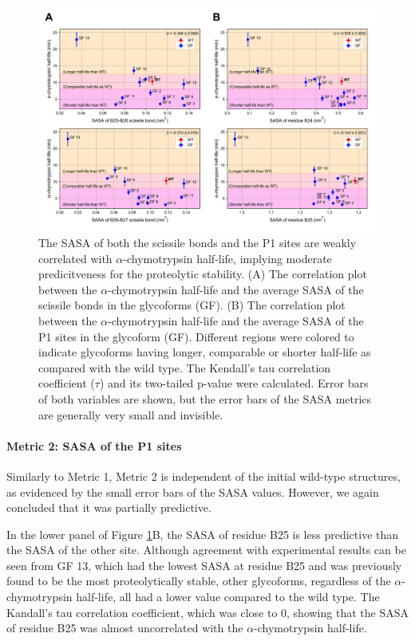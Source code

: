 \documentclass[9pt]{elife}
\begin{document}
\begin{figure}[H]
\centering
\includegraphics[width=\textwidth]{Figures/Figure4.png}
\caption{The SASA of both the scissile bonds and the P1 sites are weakly correlated with $\alpha$-chymotrypsin half-life, implying moderate predicitveness for the proteolytic stability. (A) The correlation plot between the $\alpha$-chymotrypsin half-life and the average SASA of the scissile bonds in the glycoforms (GF). (B) The correlation plot between the $\alpha$-chymotrypsin half-life and the average SASA of the P1 sites in the glycoform (GF). Different regions were colored to indicate glycoforms having longer, comparable or shorter half-life as compared with the wild type. The Kendall's tau correlation coefficient ($\tau$) and its two-tailed p-value were calculated. Error bars of both variables are shown, but the error bars of the SASA metrics are generally very small and invisible.}
\label{result_sasa}
\end{figure}

\paragraph{Metric 2: SASA of the P1 sites}
Similarly to Metric 1, Metric 2 is independent of the initial wild-type structures, as evidenced by the small error bars of the SASA values. However, we again concluded that it was partially predictive. 

In the lower panel of Figure \ref{result_sasa}B, the SASA of residue B25 is less predictive than the SASA of the other site. Although agreement with experimental results can be seen from GF 13, which had the lowest SASA at residue B25 and was previously found to be the most proteolytically stable, other glycoforms, regardless of the $\alpha$-chymotrypsin half-life, all had a lower value compared to the wild type. The Kandall's tau correlation coefficient, which was close to 0, showing that the SASA of residue B25 was almost uncorrelated with the $\alpha$-chymotrypsin half-life. 
\end{document}
